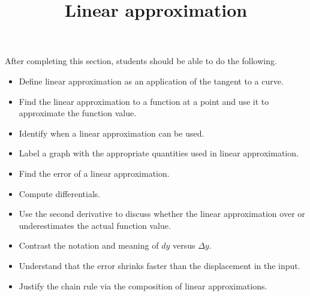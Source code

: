 \documentclass{ximera}
\title{Linear approximation}
\begin{document}
\begin{abstract}
\end{abstract}

\maketitle

\begin{sectionOutcomes}

After completing this section, students should be able to do the following.

\begin{itemize}
	\item Define linear approximation as an application of the tangent to a curve.
	\item Find the linear approximation to a function at a point and use it to approximate the function value.
	\item Identify when a linear approximation can be used.
	\item Label a graph with the appropriate quantities used in linear approximation.
	\item Find the error of a linear approximation.
        \item Compute differentials.
	\item Use the second derivative to discuss whether the linear approximation over or underestimates the actual function value.
	\item Contrast the notation and meaning of $dy$ versus $\Delta y$.
	\item Understand that the error shrinks faster than the displacement in the input.
        \item Justify the chain rule via the composition of linear approximations.
\end{itemize}

\end{sectionOutcomes}
\end{document}
